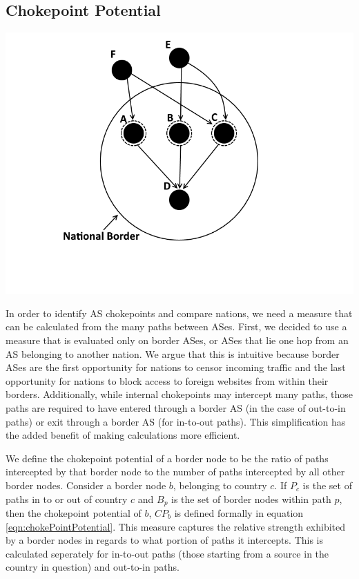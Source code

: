 \documentclass{article}
\newenvironment{Figure}
  {\par\medskip\noindent\minipage{\linewidth}}
  {\endminipage\par\medskip}
\begin{document}
\begin{multicols}{2}
\section{Chokepoint Potential}

\begin{Figure}
	\centering
	\includegraphics[width=\linewidth]{chokepoint}
	\label{fig:chokepoint}
\end{Figure}

In order to identify AS chokepoints and compare nations, we need a measure that can be calculated from the many paths between
ASes. First, we decided to use a measure that is evaluated only on border ASes, or ASes that lie one hop from an AS belonging to another nation. 
We argue that this is intuitive because border
ASes are the first opportunity for nations to censor incoming traffic and the last opportunity for nations to block access to
foreign websites from within their borders. Additionally, while internal chokepoints may intercept many paths, those paths are required
to have entered through a border AS (in the case of out-to-in paths) or exit through a border AS (for in-to-out paths). This simplification has
the added benefit of making calculations more efficient.

\par
We define the chokepoint potential of a border node to be the ratio of paths intercepted by that border node
to the number of paths intercepted by all other border nodes. Consider a border node $b$, belonging to country $c$.
If $P_c$ is the set of paths in to or out of country $c$ and $B_p$ is the set of border nodes within path $p$, then the
chokepoint potential of $b$, $CP_b$ is defined formally in equation \ref{eqn:chokePointPotential}. This measure captures
the relative strength exhibited by a border nodes in regards to what portion of paths it intercepts. This is calculated
seperately for in-to-out paths (those starting from a source in the country in question) and out-to-in paths.


\end{multicols}
\end{document}
